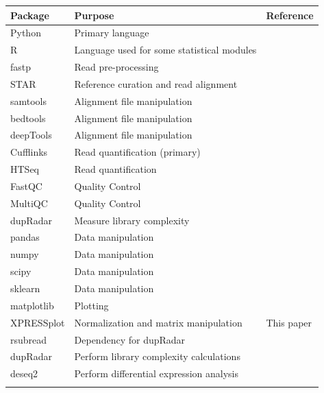 \documentclass[11pt, a4paper, oneside]{article}
\begin{document}
\begin{tabular}{p{2.4cm}p{7.5cm}p{3cm}}
 \textbf{Package} & \textbf{Purpose} & \textbf{Reference} \\
 \hline
 Python & Primary language & \\
 \hline
 R & Language used for some statistical modules & \\
 \hline
 fastp & Read pre-processing & \cite{fastp} \\
 \hline
 STAR & Reference curation and read alignment & \cite{star} \\
 \hline
 samtools & Alignment file manipulation & \cite{samtools} \\
 \hline
 bedtools & Alignment file manipulation & \cite{bedtools} \\
 \hline
 deepTools & Alignment file manipulation & \cite{deeptools} \\
 \hline
 Cufflinks & Read quantification (primary) & \cite{cufflinks} \\
 \hline
 HTSeq & Read quantification & \cite{htseq} \\
 \hline
 FastQC & Quality Control & \cite{fastqc} \\
 \hline
 MultiQC & Quality Control & \cite{multiqc} \\
 \hline
 dupRadar & Measure library complexity & \cite{dupradar} \\
 \hline
 pandas & Data manipulation & \cite{pandas} \\
 \hline
 numpy & Data manipulation & \cite{numpy1, numpy2} \\
 \hline
 scipy & Data manipulation & \cite{scipy} \\
 \hline
 sklearn & Data manipulation & \cite{sklearn} \\
 \hline
 matplotlib & Plotting & \cite{matplotlib} \\
 \hline
 XPRESSplot & Normalization and matrix manipulation & This paper \\
 \hline
 rsubread & Dependency for dupRadar & \cite{rsubread} \\
 \hline
 dupRadar & Perform library complexity calculations & \cite{dupradar} \\
 \hline
 deseq2 & Perform differential expression analysis & \cite{deseq2} \\
 \label{Tab:software_pipe}
\end{tabular}
\newline
\end{document}
